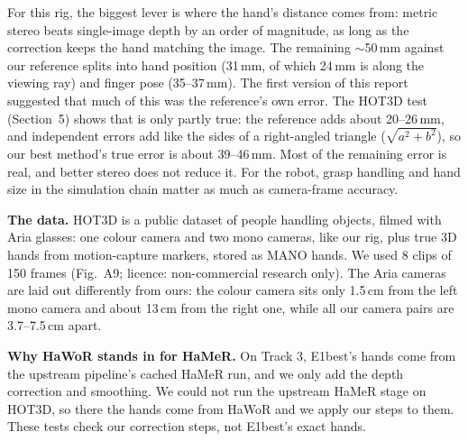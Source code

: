 \documentclass[10pt]{article}
\newcommand{\sect}[1]{\vspace{3pt}{\large\bfseries #1}\par\vspace{1pt}}
\begin{document}
\sect{4. Discussion}
For this rig, the biggest lever is where the hand's distance comes from: metric stereo beats single-image depth by an
order of magnitude, as long as the correction keeps the hand matching the image. The remaining $\sim$50\,mm against our
reference splits into hand position (31\,mm, of which 24\,mm is along the viewing ray) and finger pose (35--37\,mm).
The first version of this report suggested that much of this was the reference's own error. The HOT3D test (Section~5)
shows that is only partly true: the reference adds about 20--26\,mm, and independent errors add like the sides of a
right-angled triangle ($\sqrt{a^2+b^2}$), so our best method's true error is about 39--46\,mm. Most of the remaining
error is real, and better stereo does not reduce it. For the robot, grasp handling and hand size in the simulation chain
matter as much as camera-frame accuracy.

\sect{5. Checks against true hand positions (HOT3D)}
\textbf{The data.} HOT3D is a public dataset of people handling objects, filmed with Aria glasses: one colour camera and
two mono cameras, like our rig, plus true 3D hands from motion-capture markers, stored as MANO hands. We used 8 clips of
150 frames (Fig.~A9; licence: non-commercial research only). The Aria cameras are laid out differently from ours: the
colour camera sits only 1.5\,cm from the left mono camera and about 13\,cm from the right one, while all our camera pairs
are 3.7--7.5\,cm apart.

\textbf{Why HaWoR stands in for HaMeR.} On Track 3, E1best's hands come from the upstream pipeline's cached HaMeR run,
and we only add the depth correction and smoothing. We could not run the upstream HaMeR stage on HOT3D, so there the hands
come from HaWoR and we apply our steps to them. These tests check our correction steps, not E1best's exact hands.
\end{document}
